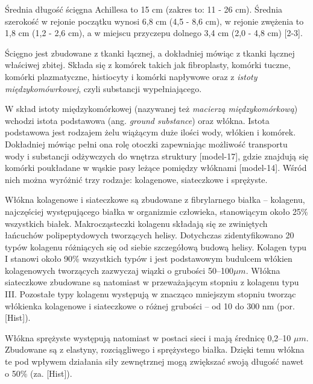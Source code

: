 Średnia długość ścięgna Achillesa to 15 cm (zakres to: 11 - 26 cm). Średnia szerokość w rejonie początku wynosi 6,8 cm (4,5 - 8,6 cm), w rejonie zwężenia to 1,8 cm (1,2 - 2,6 cm), a w miejscu przyczepu dolnego 3,4 cm (2,0 - 4,8 cm) [2-3].

Ścięgno jest zbudowane z tkanki łącznej, a dokładniej mówiąc z tkanki łącznej właściwej zbitej. Składa się z komórek takich jak fibroplasty, komórki tuczne, komórki plazmatyczne, histiocyty i komórki napływowe oraz z \textit{istoty międzykomówrkowej}, czyli substancji wypełniającego. 

W skład istoty międzykomórkowej (nazywanej też \textit{macierzą międzykomórkową}) wchodzi istota podstawowa (ang. \textit{ground substance}) oraz włókna. Istota podstawowa jest rodzajem żelu wiążącym duże ilości wody, włókien i komórek. Dokładniej mówiąc pełni ona rolę otoczki zapewniając możliwość transportu wody i substancji odżywczych do wnętrza struktury [model-17], gdzie znajdują się komórki poukładane w wąskie pasy leżące pomiędzy włóknami [model-14]. Wśród nich można wyróżnić trzy rodzaje: kolagenowe, siateczkowe i sprężyste.

Włókna kolagenowe i siateczkowe są zbudowane z fibrylarnego białka -- kolagenu, najczęściej występującego białka w organizmie człowieka, stanowiącym około 25\% wszystkich białek. Makrocząsteczki kolagenu składają się ze zwiniętych łańcuchów polipeptydowych tworzących helisy. Dotychczas zidentyfikowano 20 typów kolagenu różniących się od siebie szczegółową budową helisy. Kolagen typu I stanowi około 90\% wszystkich typów i jest podstawowym budulcem włókien kolagenowych tworzących zazwyczaj wiązki o grubości 50--100$\mu$$m$. Włókna siateczkowe zbudowane są natomiast w przeważającym stopniu z kolagenu typu III. Pozostałe typy kolagenu występują w znacząco mniejszym stopniu tworząc włókienka kolagenowe i siateczkowe o różnej grubości -- od 10 do 300 nm (por. [Hist]).

Włókna sprężyste występują natomiast w postaci sieci i mają średnicę 0,2--10 $\mu$$m$. Zbudowane są z elastyny, rozciągliwego i sprężystego białka. Dzięki temu włókna te pod wpływem działania siły zewnętrznej mogą zwiększać swoją długość nawet o 50\% (za. [Hist]). 

